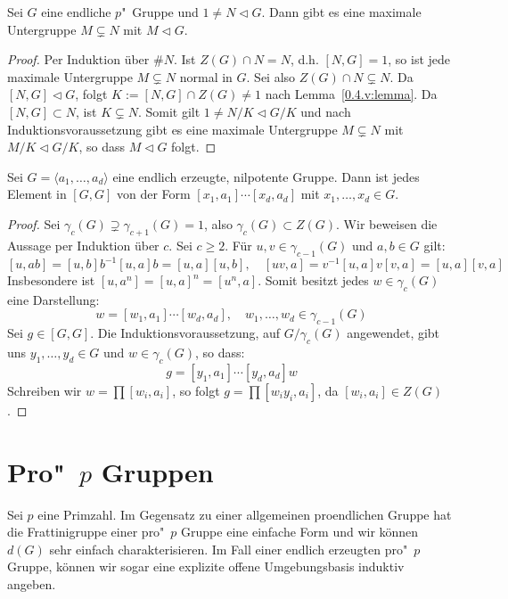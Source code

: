 \documentclass[11pt,a4paper,openany]{memoir}
\begin{document}
\begin{proposition}\label{0.4.v}
Sei $G$ eine endliche $p$"~Gruppe und $1\neq N\lhd G$. Dann gibt es eine maximale Untergruppe $M\subsetneq N$ mit $M\lhd G$.
\end{proposition}

\begin{proof}
Per Induktion über $\#N$. Ist $Z(G)\cap N=N$, d.h. $[N,G]=1$, so ist jede maximale Un\-ter\-grup\-pe $M\subsetneq N$ normal in $G$. Sei also $Z(G)\cap N\subsetneq N$. Da $[N,G]\lhd G$, folgt $K:= [N,G]\cap Z(G)\neq 1$ nach Lemma~\ref{0.4.v:lemma}. Da $[N,G]\subset N$, ist $K\subsetneq N$. Somit gilt $1\neq N/K\lhd G/K$ und nach Induktionsvoraussetzung gibt es eine maximale Untergruppe $M\subsetneq N$ mit $M/K\lhd G/K$, so dass $M\lhd G$ folgt.
\end{proof}

\begin{lemma}\label{1.23}
Sei $G=\langle a_1,\ldots,a_d\rangle$ eine endlich erzeugte, nilpotente Gruppe. Dann ist jedes Element in $[G,G]$ von der Form $[x_1,a_1]\cdots[x_d,a_d]$ mit $x_1,\ldots,x_d\in G$.
\end{lemma}

\begin{proof}
Sei $\gamma_c(G)\supsetneq \gamma_{c+1}(G)=1$, also $\gamma_c(G)\subset Z(G)$. Wir beweisen die Aussage per Induktion über $c$. Sei $c\geq 2$. Für $u,v\in\gamma_{c-1}(G)$ und $a,b\in G$ gilt:
\[[u,ab]=[u,b]b^{-1}[u,a]b=[u,a][u,b],\quad [uv,a]=v^{-1}[u,a]v[v,a]=[u,a][v,a] \]
Insbesondere ist $[u,a^n]=[u,a]^n=[u^n,a]$. Somit besitzt jedes $w\in\gamma_c(G)$ eine Darstellung:
\[w=[w_1,a_1]\cdots[w_d,a_d],\quad w_1,\ldots,w_d\in\gamma_{c-1}(G) \]
Sei $g\in[G,G]$. Die Induktionsvoraussetzung, auf $G/\gamma_c(G)$ angewendet, gibt uns $y_1,\ldots,y_d\in G$ und $w\in\gamma_c(G)$, so dass:
\[g=[y_1,a_1]\cdots [y_d,a_d]w \]
Schreiben wir $w=\prod[w_i,a_i]$, so folgt $g=\prod[w_iy_i,a_i]$, da $[w_i,a_i]\in Z(G)$.
\end{proof}

\section{Pro"~$p$ Gruppen}

Sei $p$ eine Primzahl. Im Gegensatz zu einer allgemeinen proendlichen Gruppe hat die Frattinigruppe einer pro"~$p$ Gruppe eine einfache Form und wir können $d(G)$ sehr einfach charakterisieren. Im Fall einer endlich erzeugten pro"~$p$ Gruppe, können wir sogar eine explizite offene Umgebungsbasis induktiv angeben.
\end{document}
